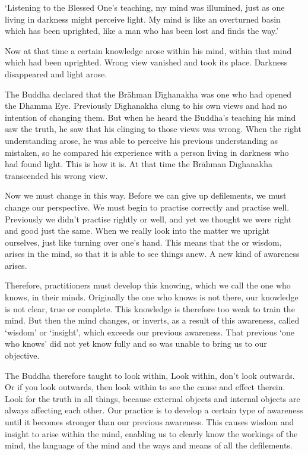 `Listening to the Blessed One's teaching, my mind was illumined, just as one living in darkness might perceive light. My mind is like an overturned basin which has been uprighted, like a man who has been lost and finds the way.' 

Now at that time a certain knowledge arose within his mind, within that mind which had been uprighted. Wrong view vanished and  took its place. Darkness disappeared and light arose. 

The Buddha declared that the Br\=ahman D\={\i}ghanakha was one who had opened the Dhamma Eye. Previously D\={\i}ghanakha clung to his own views and had no intention of changing them. But when he heard the Buddha's teaching his mind saw the truth, he saw that his clinging to those views was wrong. When the right understanding arose, he was able to perceive his previous understanding as mistaken, so he compared his experience with a person living in darkness who had found light. This is how it is. At that time the Br\=ahman D\={\i}ghanakha transcended his wrong view. 

Now we must change in this way. Before we can give up defilements, we must change our perspective. We must begin to practise correctly and practise well. Previously we didn't practise rightly or well, and yet we thought we were right and good just the same. When we really look into the matter we upright ourselves, just like turning over one's hand. This means that the  or wisdom, arises in the mind, so that it is able to see things anew. A new kind of awareness arises. 

Therefore, practitioners must develop this knowing, which we call  the one who knows, in their minds. Originally the one who knows is not there, our knowledge is not clear, true or complete. This knowledge is therefore too weak to train the mind. But then the mind changes, or inverts, as a result of this awareness, called `wisdom' or `insight', which exceeds our previous awareness. That previous `one who knows' did not yet know fully and so was unable to bring us to our objective. 

The Buddha therefore taught to look within,  Look within, don't look outwards. Or if you look outwards, then look within to see the cause and effect therein. Look for the truth in all things, because external objects and internal objects are always affecting each other. Our practice is to develop a certain type of awareness until it becomes stronger than our previous awareness. This causes wisdom and insight to arise within the mind, enabling us to clearly know the workings of the mind, the language of the mind and the ways and means of all the defilements. 

